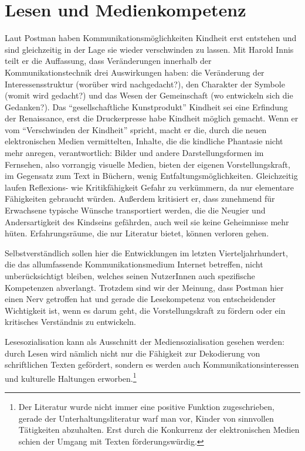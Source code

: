 
\section{Lesen und Medienkompetenz}

  Laut Postman haben Kommunikationsmöglichkeiten Kindheit erst entstehen und
  sind gleichzeitig in  der Lage sie wieder verschwinden zu lassen. Mit Harold
  Innis teilt er die Auffassung,  dass Veränderungen innerhalb der
  Kommunikationstechnik drei Auswirkungen haben: die Veränderung der
  Interessensstruktur (worüber wird nachgedacht?), den Charakter der Symbole
  (womit wird gedacht?) und das Wesen der Gemeinschaft (wo entwickeln sich die
  Gedanken?). \parencite[34]{Postman1985} Das \enquote{gesellschaftliche
  Kunstprodukt} Kindheit sei eine Erfindung der Renaissance, erst die
  Druckerpresse habe Kindheit möglich gemacht. Wenn er vom \enquote{Verschwinden
  der Kindheit} spricht, macht er die, durch die neuen elektronischen Medien
  vermittelten, Inhalte, die die kindliche Phantasie nicht mehr anregen,
  verantwortlich: Bilder und andere Darstellungsformen im Fernsehen, also
  vorrangig visuelle Medien, bieten der eigenen Vorstellungskraft, im Gegensatz
  zum Text in Büchern, wenig Entfaltungsmöglichkeiten. Gleichzeitig laufen
  Reflexions- wie Kritikfähigkeit Gefahr zu verkümmern, da nur elementare
  Fähigkeiten gebraucht würden. Außerdem kritisiert er, dass zunehmend für
  Erwachsene typische Wünsche transportiert werden, die die Neugier und
  Andersartigkeit des Kindseins gefährden, auch weil sie keine Geheimnisse mehr
  hüten. \parencite[93\psq]{Postman1985} Erfahrungsräume, die nur Literatur
  bietet, können verloren gehen.

  Selbstverständlich sollen hier die Entwicklungen im letzten
  Vierteljahrhundert, die das allumfassende Kommunikationsmedium Internet
  betreffen, nicht unberücksichtigt bleiben, welches seinen NutzerInnen auch
  spezifische Kompetenzen abverlangt. Trotzdem sind wir der Meinung, dass
  Postman hier einen Nerv getroffen hat und gerade die Lesekompetenz von
  entscheidender Wichtigkeit ist, wenn es darum geht, die Vorstellungskraft zu
  fördern oder ein kritisches Verständnis zu entwickeln.

  Lesesozialisation kann als Ausschnitt der Mediensozialisation gesehen werden:
  durch Lesen wird nämlich nicht nur die Fähigkeit zur Dekodierung von
  schriftlichen Texten gefördert, sondern es werden auch
  Kommunikationsinteressen und kulturelle Haltungen erworben.\footnote{Der
  Literatur wurde nicht immer eine positive Funktion zugeschrieben, gerade der
  Unterhaltungsliteratur warf man vor, Kinder von sinnvollen Tätigkeiten
  abzuhalten. Erst durch die Konkurrenz der elektronischen Medien schien der
  Umgang mit Texten förderungswürdig. } \parencite[220\psqq]{Weinkauff2010}